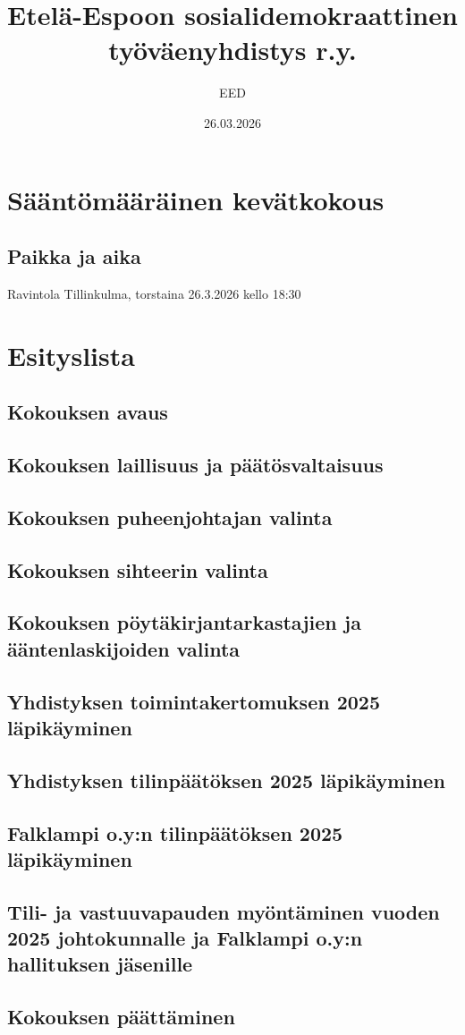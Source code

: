 \documentclass[a4paper,12pt]{article}
\title{Etelä-Espoon sosialidemokraattinen työväenyhdistys r.y.}
\author{EED}
\date{26.03.2026}
\begin{document}
\maketitle
\tableofcontents
\section*{Sääntömääräinen kevätkokous}
\subsection*{Paikka ja aika}
Ravintola Tillinkulma, torstaina 26.3.2026 kello 18:30
\section*{Esityslista}
\subsection{Kokouksen avaus}
\subsection{Kokouksen laillisuus ja päätösvaltaisuus}
\subsection{Kokouksen puheenjohtajan valinta}
\subsection{Kokouksen sihteerin valinta}
\subsection{Kokouksen pöytäkirjantarkastajien ja ääntenlaskijoiden valinta}
\subsection{Yhdistyksen toimintakertomuksen 2025 läpikäyminen}
\subsection{Yhdistyksen tilinpäätöksen 2025 läpikäyminen}
\subsection{Falklampi o.y:n tilinpäätöksen 2025 läpikäyminen}
\subsection{Tili- ja vastuuvapauden myöntäminen vuoden 2025 johtokunnalle ja Falklampi o.y:n hallituksen jäsenille}
\subsection{Kokouksen päättäminen}
\end{document}
